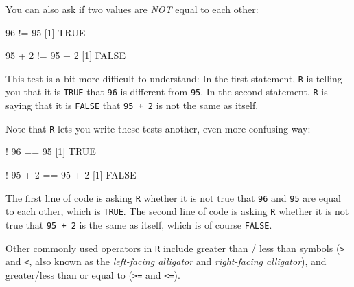 \documentclass[
]{book}
\newenvironment{Shaded}{\begin{snugshade}}{\end{snugshade}}
\newcommand{\ConstantTok}[1]{\textcolor[rgb]{0.00,0.00,0.00}{#1}}
\newcommand{\DecValTok}[1]{\textcolor[rgb]{0.00,0.00,0.81}{#1}}
\newcommand{\NormalTok}[1]{#1}
\newcommand{\SpecialCharTok}[1]{\textcolor[rgb]{0.00,0.00,0.00}{#1}}
\begin{document}
You can also ask if two values are \emph{NOT} equal to each other:

\begin{Shaded}
\begin{Highlighting}[]
\DecValTok{96} \SpecialCharTok{!=} \DecValTok{95}
\NormalTok{[}\DecValTok{1}\NormalTok{] }\ConstantTok{TRUE}
\end{Highlighting}
\end{Shaded}

\begin{Shaded}
\begin{Highlighting}[]
\DecValTok{95} \SpecialCharTok{+} \DecValTok{2} \SpecialCharTok{!=} \DecValTok{95} \SpecialCharTok{+} \DecValTok{2}
\NormalTok{[}\DecValTok{1}\NormalTok{] }\ConstantTok{FALSE}
\end{Highlighting}
\end{Shaded}

This test is a bit more difficult to understand: In the first statement, \texttt{R} is telling you that it is \texttt{TRUE} that \texttt{96} is different from \texttt{95}. In the second statement, \texttt{R} is saying that it is \texttt{FALSE} that \texttt{95\ +\ 2} is not the same as itself.

Note that \texttt{R} lets you write these tests another, even more confusing way:

\begin{Shaded}
\begin{Highlighting}[]
\SpecialCharTok{!} \DecValTok{96} \SpecialCharTok{==} \DecValTok{95}
\NormalTok{[}\DecValTok{1}\NormalTok{] }\ConstantTok{TRUE}
\end{Highlighting}
\end{Shaded}

\begin{Shaded}
\begin{Highlighting}[]
\SpecialCharTok{!} \DecValTok{95} \SpecialCharTok{+} \DecValTok{2} \SpecialCharTok{==} \DecValTok{95} \SpecialCharTok{+} \DecValTok{2}
\NormalTok{[}\DecValTok{1}\NormalTok{] }\ConstantTok{FALSE}
\end{Highlighting}
\end{Shaded}

The first line of code is asking \texttt{R} whether it is not true that \texttt{96} and \texttt{95} are equal to each other, which is \texttt{TRUE}. The second line of code is asking \texttt{R} whether it is not true that \texttt{95\ +\ 2} is the same as itself, which is of course \texttt{FALSE}.

Other commonly used operators in \texttt{R} include greater than / less than symbols (\texttt{\textgreater{}} and \texttt{\textless{}}, also known as the \emph{left-facing alligator} and \emph{right-facing alligator}), and greater/less than or equal to (\texttt{\textgreater{}=} and \texttt{\textless{}=}).
\end{document}
